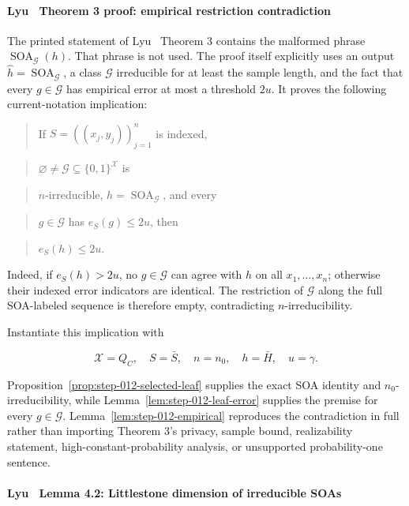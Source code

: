 \paragraph{Lyu~\citep{lyu2025} Theorem 3 proof: empirical restriction contradiction}

The printed statement of Lyu~\citep{lyu2025} Theorem 3 contains the malformed phrase
\texttt{\(\operatorname{SOA}_{\mathcal G}(h)\)}. That phrase is not used. The
proof itself explicitly uses an output
\(\widehat h=\operatorname{SOA}_{\mathcal G}\), a class
\(\mathcal G\) irreducible for at least the sample length, and the fact that
every \(g\in\mathcal G\) has empirical error at most a threshold \(2u\).
It proves the following current-notation implication:

\begin{quote}If \(S=((x_j,y_j))_{j=1}^n\) is indexed,\end{quote}
\begin{quote}\(\varnothing\ne\mathcal G\subseteq\{0,1\}^{\mathcal X}\) is\end{quote}
\begin{quote}\(n\)-irreducible, \(h=\operatorname{SOA}_{\mathcal G}\), and every\end{quote}
\begin{quote}\(g\in\mathcal G\) has \(e_S(g)\le2u\), then\end{quote}
\begin{quote}\(e_S(h)\le2u\).\end{quote}

Indeed, if \(e_S(h)>2u\), no \(g\in\mathcal G\) can agree with \(h\) on
all \(x_1,\ldots,x_n\); otherwise their indexed error indicators are
identical. The restriction of \(\mathcal G\) along the full SOA-labeled
sequence is therefore empty, contradicting \(n\)-irreducibility.

Instantiate this implication with

\[
 \mathcal X=Q_C,
 \quad S=\bar S,
 \quad n=n_0,
 \quad h=\bar H,
 \quad u=\gamma.
\tag{15}
\]

Proposition~\ref{prop:step-012-selected-leaf} supplies the exact SOA
identity and \(n_0\)-irreducibility, while
Lemma~\ref{lem:step-012-leaf-error} supplies the premise for every
\(g\in\mathcal G\). Lemma~\ref{lem:step-012-empirical} reproduces the
contradiction in full rather than importing Theorem 3's privacy, sample
bound, realizability statement, high-constant-probability analysis, or
unsupported probability-one sentence.

\paragraph{Lyu~\citep{lyu2025} Lemma 4.2: Littlestone dimension of irreducible SOAs}

